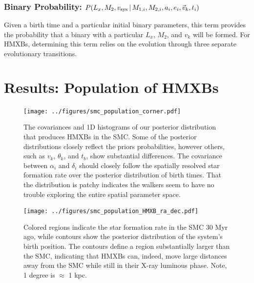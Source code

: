 \documentclass[12pt, preprint]{aastex}
\newcommand{\given}{\,|\,}
\begin{document}
\subsubsection{Binary Probability: $P(L_x, M_2, v_{\rm sys} \given M_{1,i}, M_{2,i}, a_i, e_i, \vec{v}_k, t_i)$}

Given a birth time and a particular initial binary parameters, this term provides the probability that a binary with a particular $L_x$, $M_2$, and $v_k$ will be formed. For HMXBs, determining this term relies on the evolution through three separate evolutionary transitions. 




\section{Results: Population of HMXBs} \label{sec:results_population}


\begin{figure}[h!]
\begin{center}
\texttt{[image: ../figures/smc\_population\_corner.pdf]}
\caption{ The covariances and 1D histograms of our posterior distribution that produces HMXBs in the SMC. Some of the posterior distributions closely reflect the priors probabilities, however others, such as $v_k$, $\theta_k$, and $t_b$, show substantial differences. The covariance between $\alpha_i$ and $\delta_i$ should closely follow the spatially resolved star formation rate over the posterior distribution of birth times. That the distribution is patchy indicates the walkers seem to have no trouble exploring the entire spatial parameter space.}
\label{fig:population_corner}
\end{center}
\end{figure}



\begin{figure}[h!]
\begin{center}
\texttt{[image: ../figures/smc\_population\_HMXB\_ra\_dec.pdf]}
\caption{ Colored regions indicate the star formation rate in the SMC 30 Myr ago, while contours show the posterior distribution of the system's birth position. The contours define a region substantially larger than the SMC, indicating that HMXBs can, indeed, move large distances away from the SMC while still in their X-ray luminous phase. Note, 1 degree is $\approx$ 1 kpc.}
\label{fig:population_ra_dec}
\end{center}
\end{figure}
\end{document}
